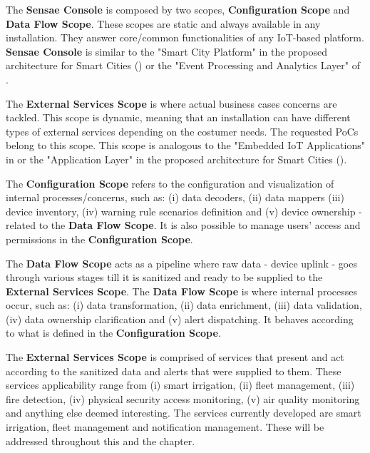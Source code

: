 The \textbf{Sensae Console} is composed by two scopes, \textbf{Configuration Scope} and \textbf{Data Flow Scope}. These scopes are static and always available in any installation. They answer core/common functionalities of any \gls{IoT}-based platform. \textbf{Sensae Console} is similar to the "Smart City Platform" in the proposed architecture for Smart Cities () or the "Event Processing and Analytics Layer" of .

The \textbf{External Services Scope} is where actual business cases concerns are tackled. This scope is dynamic, meaning that an installation can have different types of external services depending on the costumer needs. The requested \gls{PoC}s belong to this scope. This scope is analogous to the "Embedded IoT Applications" in  or the "Application Layer" in the proposed architecture for Smart Cities ().

The \textbf{Configuration Scope} refers to the configuration and visualization of internal processes/concerns, such as: (i) data decoders, (ii) data mappers (iii) device inventory, (iv) warning rule scenarios definition and (v) device ownership - related to the \textbf{Data Flow Scope}. It is also possible to manage users' access and permissions in the \textbf{Configuration Scope}.

The \textbf{Data Flow Scope} acts as a pipeline where raw data - device uplink - goes through various stages till it is sanitized and ready to be supplied to the \textbf{External Services Scope}. The \textbf{Data Flow Scope} is where internal processes occur, such as: (i) data transformation, (ii) data enrichment, (iii) data validation, (iv) data ownership clarification and (v) alert dispatching. It behaves according to what is defined in the \textbf{Configuration Scope}.

The \textbf{External Services Scope} is comprised of services that present and act according to the sanitized data and alerts that were supplied to them. These services applicability range from (i) smart irrigation, (ii) fleet management, (iii) fire detection, (iv) physical security access monitoring, (v) air quality monitoring and anything else deemed interesting. The services currently developed are smart irrigation, fleet management and notification management. These will be addressed throughout this and the  chapter.

